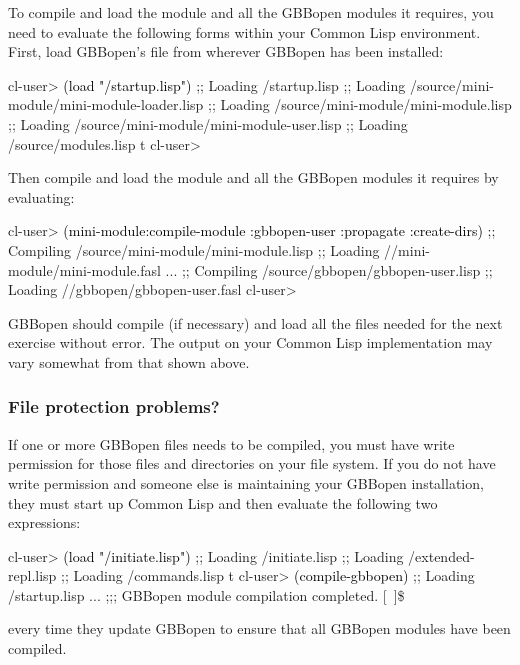 \documentclass[10pt,twoside,english,pdftex]{article}
\begin{document}
To compile and load the  module and all the GBBopen
modules it requires, you need to evaluate the following forms within your
Common Lisp environment.  First, load GBBopen's
 file from wherever GBBopen has been
installed:
%
\W\supp
\begin{example}
\textcolor{darkergray}{%
  cl-user> \textcolor{black}{(load "/startup.lisp")}
  ;; Loading /startup.lisp
  ;;  Loading /source/mini-module/mini-module-loader.lisp
  ;;   Loading /source/mini-module/mini-module.lisp
  ;;     Loading /source/mini-module/mini-module-user.lisp
  ;;  Loading /source/modules.lisp
  t
  cl-user>}
\end{example}
%
%
Then compile and load the  module and all the
GBBopen modules it requires by evaluating:
%
\W\supp\notpretop
\begin{example}
\textcolor{darkergray}{%
  cl-user> \textcolor{black}{(mini-module:compile-module :gbbopen-user :propagate :create-dirs)}
  ;; Compiling /source/mini-module/mini-module.lisp
  ;; Loading //mini-module/mini-module.fasl
       ...
  ;; Compiling /source/gbbopen/gbbopen-user.lisp
  ;; Loading //gbbopen/gbbopen-user.fasl
  cl-user>}
\end{example}

GBBopen should compile (if necessary) and load all the files needed for the
next exercise without error.  The output on your Common Lisp implementation
may vary somewhat from that shown above.

\subsubsection*{File protection problems?}

%
%
%
%
If one or more GBBopen files needs to be compiled, you must have write
permission for those files and directories on your file system.  If you do not
have write permission and someone else is maintaining your GBBopen
installation, they must start up Common Lisp and then evaluate the following
two expressions:
%
\W\supp
\begin{example}
\textcolor{darkergray}{%
  cl-user> \textcolor{black}{(load "/initiate.lisp")}
  ;; Loading /initiate.lisp
  ;;  Loading /extended-repl.lisp
  ;;  Loading /commands.lisp
  t
  cl-user> \textcolor{black}{(compile-gbbopen)}
  ;; Loading /startup.lisp
     ...
  ;;; GBBopen module compilation completed.
  [~]\$}
\end{example}
%
every time they update GBBopen to ensure that all GBBopen modules have
been compiled.
\end{document}
